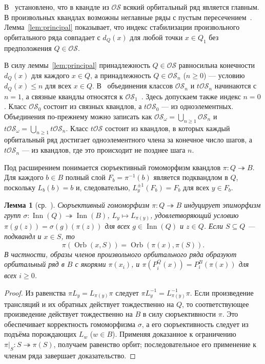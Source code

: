 \documentclass[11pt,a4paper]{article}
\newtheorem{lemma}[theorem]{Лемма}
\theoremstyle{remark}
\newcommand{\OS}{\mathcal{OS}}
\newcommand{\tOS}{t\mathcal{OS}}
\newcommand{\Inn}{\operatorname{Inn}}
\newcommand{\Orb}{\operatorname{Orb}}
\begin{document}
В~\cite[следствие~4.7]{BCNW} установлено, что в квандле из \(\OS\) всякий
орбитальный ряд является главным. В произвольных квандлах возможны
неглавные ряды с пустым пересечением~\cite[пример~4.9]{BCNW}.
Лемма~\ref{lem:principal} показывает, что индекс стабилизации
произвольного орбитального ряда совпадает с \(d_Q(x)\) для любой
точки \(x\in Q_1\) без предположения \(Q\in\OS\).

В силу леммы~\ref{lem:principal} принадлежность \(Q\in\OS\) равносильна
конечности \(d_Q(x)\) для каждого \(x\in Q\), а принадлежность
\(Q\in\OS_n\) (\(n\ge 0\)) --- условию \(d_Q(x)\le n\) для всех
\(x\in Q\). В~\cite[раздел~4.1]{BCNW} объединения классов
\(\OS_n\) и \(\tOS_n\) начинаются с \(n=1\), а связные квандлы
относятся к \(\OS_1\)~\cite[пример~4.3]{BCNW}. Здесь допускаем также
индекс \(n=0\). Класс \(\OS_0\) состоит из связных квандлов, а
\(\tOS_0\) --- из одноэлементных. Объединения по-прежнему можно
записать как \(\OS_\omega=\bigcup_{n\ge 1}\OS_n\) и
\(\tOS_\omega=\bigcup_{n\ge 1}\tOS_n\).
Класс \(\tOS\) состоит из квандлов, в которых каждый орбитальный
ряд достигает одноэлементного члена за конечное число шагов, а
\(\tOS_n\) --- из квандлов, где это происходит не позднее шага \(n\).

Под расширением понимается сюръективный гомоморфизм квандлов
\(\pi\colon Q\twoheadrightarrow B\). Для каждого \(b\in B\) полный слой
\(F_b=\pi^{-1}(b)\) является подквандлом в \(Q\), поскольку \(L_b(b)=b\)
и, следовательно, \(L_y^{\pm 1}(F_b)=F_b\) для всех \(y\in F_b\).

\begin{lemma}[ср.~{\cite[раздел~2.2, лемма~5.1]{BCNW}}]\label{lem:images}
Сюръективный гомоморфизм \(\pi\colon Q\twoheadrightarrow B\) индуцирует
эпиморфизм групп \(\sigma\colon\Inn(Q)\twoheadrightarrow\Inn(B)\),
\(L_y\mapsto L_{\pi(y)}\), удовлетворяющий условию
\(\pi(g(z))=\sigma(g)(\pi(z))\) для всех \(g\in\Inn(Q)\) и \(z\in Q\).
Если \(S\subseteq Q\) --- подквандл и \(x\in S\), то
\[
  \pi(\Orb(x,S))=\Orb(\pi(x),\pi(S)).
\]
В частности, образы членов произвольного орбитального ряда образуют
орбитальный ряд в \(B\) с якорями \(\pi(x_i)\), и
\(\pi(P_i^Q(x))=P_i^B(\pi(x))\) для всех \(i\ge 0\).
\end{lemma}

\begin{proof}
Из равенства \(\pi L_y=L_{\pi(y)}\pi\) следует
\(\pi L_y^{-1}=L_{\pi(y)}^{-1}\pi\). Если произведение трансляций и их
обратных действует тождественно на \(Q\), то соответствующее произведение
действует тождественно на \(B\) в силу сюръективности \(\pi\). Это
обеспечивает корректность гомоморфизма \(\sigma\), а его сюръективность
следует из подъёма порождающих \(L_w\) (\(w\in B\)). Применяя
доказанное к ограничению \(\pi|_S\colon S\twoheadrightarrow\pi(S)\),
получаем равенство орбит; последовательное его применение к членам ряда
завершает доказательство.
\end{proof}
\end{document}
